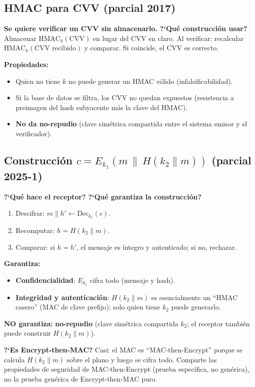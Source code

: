 \documentclass[11pt,a4paper]{article}
\begin{document}
\subsection{HMAC para CVV (parcial 2017)}

\begin{examen}
\textbf{Se quiere verificar un CVV sin almacenarlo.  ?`Qu\'e construcci\'on usar?}\\
Almacenar $\mathrm{HMAC}_k(\text{CVV})$ en lugar del CVV en claro.
Al verificar: recalcular $\mathrm{HMAC}_k(\text{CVV recibido})$ y comparar.
Si coincide, el CVV es correcto.

\textbf{Propiedades:}
\begin{itemize}[leftmargin=1.4em,nosep]
  \item Quien no tiene $k$ no puede generar un HMAC v\'alido (infalsificabilidad).
  \item Si la base de datos se filtra, los CVV no quedan expuestos (resistencia a
        preimagen del hash subyacente m\'as la clave del HMAC).
  \item \textbf{No da no-repudio} (clave sim\'etrica compartida entre el sistema
        emisor y el verificador).
\end{itemize}
\end{examen}

\subsection{Construcci\'on $c = E_{k_1}(m\,\|\,H(k_2\|m))$ (parcial 2025-1)}

\begin{examen}
\textbf{?`Qu\'e hace el receptor?  ?`Qu\'e garantiza la construcci\'on?}
\begin{enumerate}[leftmargin=1.6em]
  \item Descifrar: $m\|h' \leftarrow \mathrm{Dec}_{k_1}(c)$.
  \item Recomputar: $h = H(k_2\|m)$.
  \item Comparar: si $h = h'$, el mensaje es \'integro y autenticado; si no,
        rechazar.
\end{enumerate}

\textbf{Garantiza:}
\begin{itemize}[leftmargin=1.4em,nosep]
  \item \textbf{Confidencialidad}: $E_{k_1}$ cifra todo (mensaje y hash).
  \item \textbf{Integridad y autenticaci\'on}: $H(k_2\|m)$ es esencialmente un
        ``HMAC casero'' (MAC de clave prefijo); solo quien tiene $k_2$ puede
        generarlo.
\end{itemize}

\textbf{NO garantiza:}  \textbf{no-repudio} (clave sim\'etrica compartida $k_2$;
el receptor tambi\'en puede construir $H(k_2\|m)$).

\textbf{?`Es Encrypt-then-MAC?}  Casi: el MAC es ``MAC-then-Encrypt'' porque se
calcula $H(k_2\|m)$ sobre el plano y luego se cifra todo.  Comparte las
propiedades de seguridad de MAC-then-Encrypt (prueba espec\'ifica, no gen\'erica),
no la prueba gen\'erica de Encrypt-then-MAC puro.
\end{examen}
\end{document}
